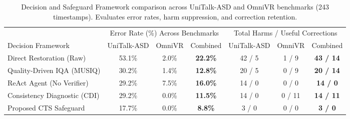 \begin{table}[t]
\centering\small
\caption{Decision and Safeguard Framework comparison across UniTalk-ASD and OmniVR benchmarks (243 timestamps). Evaluates error rates, harm suppression, and correction retention.}
\label{tab:framework_comparison}
\setlength{\tabcolsep}{5pt}
\begin{tabular}{@{}lccc|ccc@{}}
\toprule
 & \multicolumn{3}{c}{Error Rate (\%) Across Benchmarks} & \multicolumn{3}{c}{Total Harms / Useful Corrections} \\
\cmidrule(lr){2-4} \cmidrule(lr){5-7}
Decision Framework & UniTalk-ASD & OmniVR & Combined & UniTalk-ASD & OmniVR & Combined \\
\midrule
Direct Restoration (Raw)         &  53.1\% &   2.0\% & \textbf{ 22.2\%} & 42 /  5 &  1 /  9 & \textbf{43 / 14} \\
Quality-Driven IQA (MUSIQ)       &  30.2\% &   1.4\% & \textbf{ 12.8\%} & 20 /  5 &  0 /  9 & \textbf{20 / 14} \\
ReAct Agent (No Verifier)        &  29.2\% &   7.5\% & \textbf{ 16.0\%} & 14 /  0 &  0 /  0 & \textbf{14 /  0} \\
Consistency Diagnostic (CDI)     &  29.2\% &   0.0\% & \textbf{ 11.5\%} & 14 /  0 &  0 / 11 & \textbf{14 / 11} \\
Proposed CTS Safeguard           &  17.7\% &   0.0\% & \textbf{  8.8\%} &  3 /  0 &  0 /  0 & \textbf{ 3 /  0} \\
\bottomrule
\end{tabular}
\end{table}